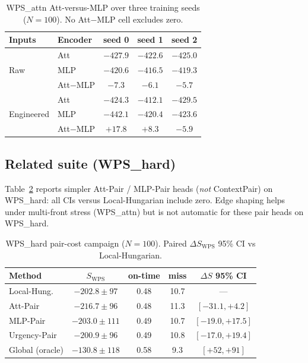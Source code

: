 \documentclass[journal,twocolumn,10pt]{IEEEtran}
\begin{document}
\begin{table}[t]
\centering
\caption{WPS\_attn Att-versus-MLP over three training seeds (\(N{=}100\)). No Att$-$MLP cell excludes zero.}
\label{tab:seeds}
\setlength{\tabcolsep}{3pt}
\begin{tabular}{llccc}
\toprule
Inputs & Encoder & seed 0 & seed 1 & seed 2 \\
\midrule
\multirow{3}{*}{Raw}
 & Att & $-427.9$ & $-422.6$ & $-425.0$ \\
 & MLP & $-420.6$ & $-416.5$ & $-419.3$ \\
 & Att$-$MLP & $-7.3$ & $-6.1$ & $-5.7$ \\
\midrule
\multirow{3}{*}{Engineered}
 & Att & $-424.3$ & $-412.1$ & $-429.5$ \\
 & MLP & $-442.1$ & $-420.4$ & $-423.6$ \\
 & Att$-$MLP & $+17.8$ & $+8.3$ & $-5.9$ \\
\bottomrule
\end{tabular}
\end{table}

\subsection{Related suite (WPS\_hard)}
Table~\ref{tab:hard} reports simpler Att-Pair / MLP-Pair heads (\emph{not} ContextPair) on WPS\_hard: all CIs versus Local-Hungarian include zero.
Edge shaping helps under multi-front stress (WPS\_attn) but is not automatic for these pair heads on WPS\_hard.

\begin{table}[t]
\centering
\caption{WPS\_hard pair-cost campaign (\(N{=}100\)). Paired \(\Delta S_{\mathrm{WPS}}\) 95\% CI vs Local-Hungarian.}
\label{tab:hard}
\setlength{\tabcolsep}{3pt}
\begin{tabular}{lcccc}
\toprule
Method & \(S_{\mathrm{WPS}}\) & on-time & miss & \(\Delta S\) 95\% CI \\
\midrule
Local-Hung. & $-202.8\pm97$ & 0.48 & 10.7 & --- \\
Att-Pair & $-216.7\pm96$ & 0.48 & 11.3 & $[-31.1,+4.2]$ \\
MLP-Pair & $-203.0\pm111$ & 0.49 & 10.7 & $[-19.0,+17.5]$ \\
Urgency-Pair & $-200.9\pm96$ & 0.49 & 10.8 & $[-17.0,+19.4]$ \\
Global (oracle) & $-130.8\pm118$ & 0.58 & 9.3 & $[+52,+91]$ \\
\bottomrule
\end{tabular}
\end{table}
\end{document}
